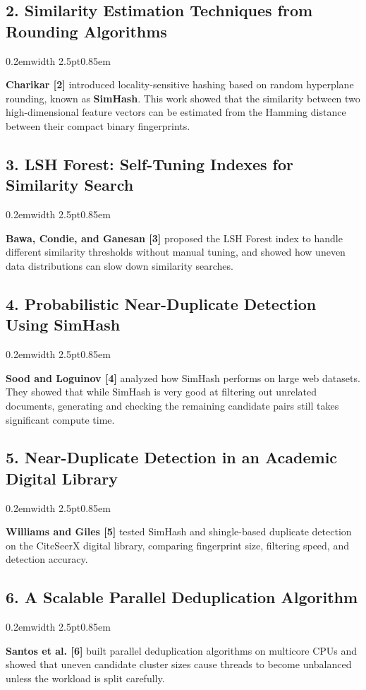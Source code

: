 \documentclass[11pt,a4paper]{article}
\renewcommand{\_}{\textunderscore\allowbreak}
\newenvironment{litquote}{%
  \par\vspace{0.15em}%
  \noindent\kern0.2em\textcolor{quoteborder}{\vrule width 2.5pt}\kern0.85em%
  \begin{minipage}{\dimexpr\textwidth-1.3em\relax}%
  \itshape\color{black!88}%
}{%
  \end{minipage}\par\vspace{0.35em}%
}
\begin{document}
\subsection*{2. Similarity Estimation Techniques from Rounding Algorithms}
\begin{litquote}
\textbf{Charikar [2]} introduced locality-sensitive hashing based on random hyperplane rounding, known as \textbf{SimHash}. This work showed that the similarity between two high-dimensional feature vectors can be estimated from the Hamming distance between their compact binary fingerprints.
\end{litquote}

\subsection*{3. LSH Forest: Self-Tuning Indexes for Similarity Search}
\begin{litquote}
\textbf{Bawa, Condie, and Ganesan [3]} proposed the LSH Forest index to handle different similarity thresholds without manual tuning, and showed how uneven data distributions can slow down similarity searches.
\end{litquote}

\subsection*{4. Probabilistic Near-Duplicate Detection Using SimHash}
\begin{litquote}
\textbf{Sood and Loguinov [4]} analyzed how SimHash performs on large web datasets. They showed that while SimHash is very good at filtering out unrelated documents, generating and checking the remaining candidate pairs still takes significant compute time.
\end{litquote}

\subsection*{5. Near-Duplicate Detection in an Academic Digital Library}
\begin{litquote}
\textbf{Williams and Giles [5]} tested SimHash and shingle-based duplicate detection on the CiteSeerX digital library, comparing fingerprint size, filtering speed, and detection accuracy.
\end{litquote}

\subsection*{6. A Scalable Parallel Deduplication Algorithm}
\begin{litquote}
\textbf{Santos et al. [6]} built parallel deduplication algorithms on multicore CPUs and showed that uneven candidate cluster sizes cause threads to become unbalanced unless the workload is split carefully.
\end{litquote}
\end{document}
